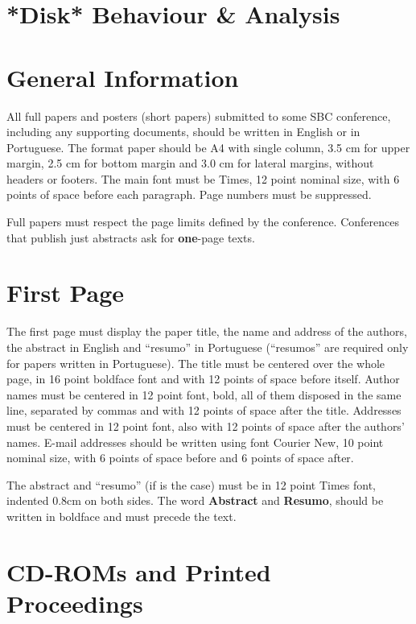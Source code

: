 \documentclass[12pt]{article}
\begin{document}
\section{*Disk* Behaviour \& Analysis}

\section{General Information}

All full papers and posters (short papers) submitted to some SBC conference,
including any supporting documents, should be written in English or in
Portuguese. The format paper should be A4 with single column, 3.5 cm for upper
margin, 2.5 cm for bottom margin and 3.0 cm for lateral margins, without
headers or footers. The main font must be Times, 12 point nominal size, with 6
points of space before each paragraph. Page numbers must be suppressed.

Full papers must respect the page limits defined by the conference.
Conferences that publish just abstracts ask for \textbf{one}-page texts.

\section{First Page} \label{sec:firstpage}

The first page must display the paper title, the name and address of the
authors, the abstract in English and ``resumo'' in Portuguese (``resumos'' are
required only for papers written in Portuguese). The title must be centered
over the whole page, in 16 point boldface font and with 12 points of space
before itself. Author names must be centered in 12 point font, bold, all of
them disposed in the same line, separated by commas and with 12 points of
space after the title. Addresses must be centered in 12 point font, also with
12 points of space after the authors' names. E-mail addresses should be
written using font Courier New, 10 point nominal size, with 6 points of space
before and 6 points of space after.

The abstract and ``resumo'' (if is the case) must be in 12 point Times font,
indented 0.8cm on both sides. The word \textbf{Abstract} and \textbf{Resumo},
should be written in boldface and must precede the text.

\section{CD-ROMs and Printed Proceedings}
\end{document}
